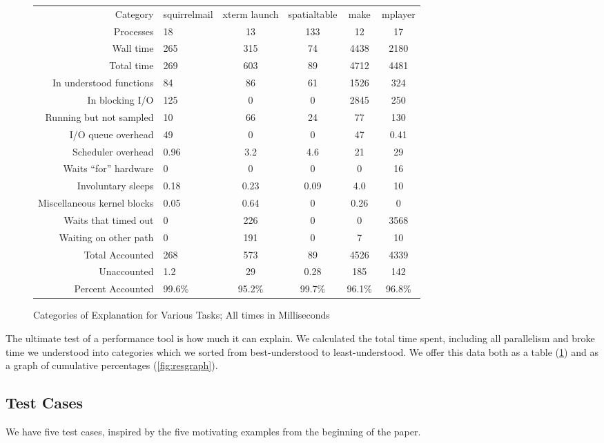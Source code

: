 \documentclass[10pt]{article}
\begin{document}
\begin{figure}[t]
\begin{tabular}{r|C{1in}cccc}
Category & squirrelmail & xterm launch & spatialtable & make & mplayer\\
Processes & 18 & 13 & 133 & 12 & 17\\
\hline
Wall time & 265 & 315 & 74 & 4438 & 2180\\
Total time & 269 & 603 & 89 & 4712 & 4481\\
\hline
In understood functions & 84 & 86 & 61 & 1526 & 324\\
In blocking I/O & 125 & 0 & 0 & 2845 & 250\\
Running but not sampled & 10 & 66 & 24 & 77 & 130\\
I/O queue overhead & 49 & 0 & 0 & 47 & 0.41\\
Scheduler overhead & 0.96 & 3.2 & 4.6 & 21 & 29\\
Waits ``for'' hardware & 0 & 0 & 0 & 0 & 16\\
Involuntary sleeps & 0.18 & 0.23 & 0.09 & 4.0 & 10\\
Miscellaneous kernel blocks & 0.05 & 0.64 & 0 & 0.26 & 0\\
Waits that timed out & 0 & 226 & 0 & 0 & 3568\\
Waiting on other path & 0 & 191 & 0 & 7 & 10\\
\hline
Total Accounted & 268 & 573 & 89 & 4526 & 4339\\
Unaccounted & 1.2 & 29 & 0.28 & 185 & 142\\
Percent Accounted & 99.6\% & 95.2\% & 99.7\% & 96.1\% & 96.8\%\\
\end{tabular}
\caption{Categories of Explanation for Various Tasks; All times in Milliseconds}
\label{fig:restab}
\end{figure}

The ultimate test of a performance tool is how much it can explain.  We calculated the total time spent, including all parallelism and broke time we understood into categories which we sorted from best-understood to least-understood.  We offer this data both as a table (\ref{fig:restab}) and as a graph of cumulative percentages (\ref{fig:resgraph}).

\subsection{Test Cases}

We have five test cases, inspired by the five motivating examples from the beginning of the paper.
\end{document}
